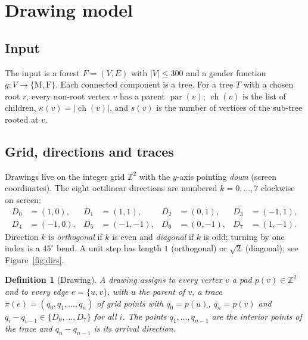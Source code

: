 \documentclass[11pt,a4paper]{article}
\newtheorem{definition}{Definition}
\theoremstyle{remark}
\newcommand{\Z}{\mathbb{Z}}
\newcommand{\pos}{p}
\begin{document}
\section{Drawing model}\label{sec:model}

\subsection{Input}
The input is a forest $F=(V,E)$ with $|V|\le 300$ and a gender function $g:V\to\{\mathrm M,\mathrm F\}$.
Each connected component is a tree. For a tree $T$ with a chosen root $r$, every non-root vertex $v$ has a parent
$\operatorname{par}(v)$; $\operatorname{ch}(v)$ is the list of children, $\kappa(v)=|\operatorname{ch}(v)|$, and
$s(v)$ is the number of vertices of the sub-tree rooted at $v$.

\subsection{Grid, directions and traces}
Drawings live on the integer grid $\Z^2$ with the $y$-axis pointing \emph{down} (screen coordinates). The eight
octilinear directions are numbered $k=0,\dots,7$ clockwise on screen:
\[
\begin{aligned}
D_0&=(1,0), & D_1&=(1,1), & D_2&=(0,1), & D_3&=(-1,1),\\
D_4&=(-1,0),& D_5&=(-1,-1),& D_6&=(0,-1),& D_7&=(1,-1).
\end{aligned}
\]
Direction $k$ is \emph{orthogonal} if $k$ is even and \emph{diagonal} if $k$ is odd; turning by one index is a
$45^\circ$ bend. A unit step has length $1$ (orthogonal) or $\sqrt2$ (diagonal); see Figure~\ref{fig:dirs}.

\begin{definition}[Drawing]
A drawing assigns to every vertex $v$ a \emph{pad} $\pos(v)\in\Z^2$ and to every edge $e=\{u,v\}$, with $u$ the
parent of $v$, a \emph{trace} $\pi(e)=(q_0,q_1,\dots,q_n)$ of grid points with $q_0=\pos(u)$, $q_n=\pos(v)$ and
$q_i-q_{i-1}\in\{D_0,\dots,D_7\}$ for all $i$. The points $q_1,\dots,q_{n-1}$ are the \emph{interior points} of the
trace and $q_{n}-q_{n-1}$ is its \emph{arrival direction}.
\end{definition}
\end{document}
